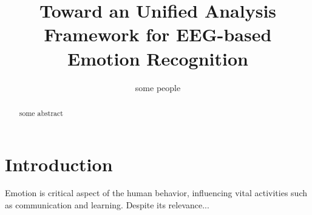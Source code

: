 \documentclass{sig-alternate}
\begin{document}
%

\title{Toward an Unified Analysis Framework for EEG-based Emotion Recognition}


%
\author{
%
%
\alignauthor
some people
}



\maketitle
\begin{abstract}
some abstract
\end{abstract}



\section{Introduction}
Emotion is critical aspect of the human behavior, influencing vital activities 
such as communication and  learning. Despite its relevance...  
\end{document}
